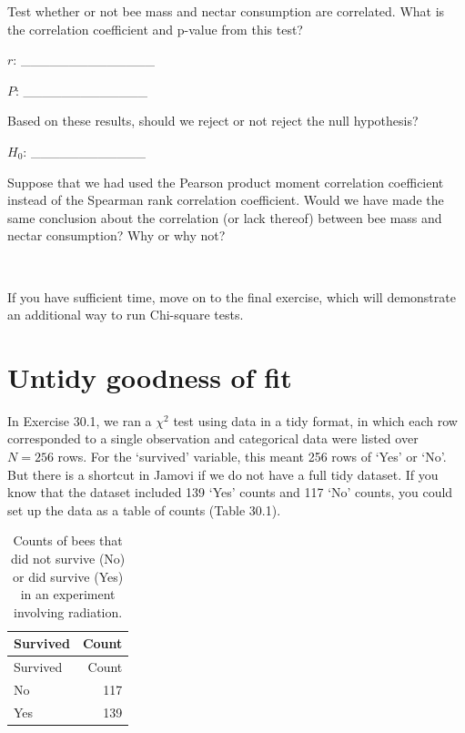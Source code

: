 \documentclass[
]{scrbook}
\begin{document}
Test whether or not bee mass and nectar consumption are correlated.
What is the correlation coefficient and p-value from this test?

\(r\): \_\_\_\_\_\_\_\_\_\_\_\_\_\_

\(P\): \_\_\_\_\_\_\_\_\_\_\_\_\_

Based on these results, should we reject or not reject the null hypothesis?

\(H_{0}\): \_\_\_\_\_\_\_\_\_\_\_\_

Suppose that we had used the Pearson product moment correlation coefficient instead of the Spearman rank correlation coefficient.
Would we have made the same conclusion about the correlation (or lack thereof) between bee mass and nectar consumption?
Why or why not?

\begin{verbatim}


\end{verbatim}

If you have sufficient time, move on to the final exercise, which will demonstrate an additional way to run Chi-square tests.

\hypertarget{untidy-goodness-of-fit}{%
\section{Untidy goodness of fit}\label{untidy-goodness-of-fit}}

In Exercise 30.1, we ran a \(\chi^{2}\) test using data in a tidy format, in which each row corresponded to a single observation and categorical data were listed over \(N = 256\) rows.
For the `survived' variable, this meant 256 rows of `Yes' or `No'.
But there is a shortcut in Jamovi if we do not have a full tidy dataset.
If you know that the dataset included 139 `Yes' counts and 117 `No' counts, you could set up the data as a table of counts (Table 30.1).

\begin{longtable}[]{@{}lr@{}}
\caption{\label{tab:unnamed-chunk-157}Counts of bees that did not survive (No) or did survive (Yes) in an experiment involving radiation.}\tabularnewline
\toprule
Survived & Count \\
\midrule
\endfirsthead
\toprule
Survived & Count \\
\midrule
\endhead
No & 117 \\
Yes & 139 \\
\bottomrule
\end{longtable}
\end{document}
